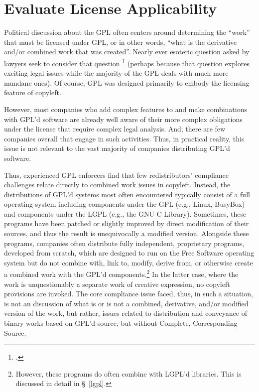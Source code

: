\section{Evaluate License Applicability}
\label{derivative-works}
Political discussion about the GPL often centers around determining the
``work'' that must be licensed under GPL, or in other words, ``what is the
derivative and/or combined work that was created''.  Nearly ever esoteric
question asked by lawyers seek to consider that question
\footnote{.} (perhaps because
that question explores exciting legal issues while the majority of the GPL
deals with much more mundane ones).
Of course, GPL was designed
primarily to embody the licensing feature of copyleft.

However, most companies who add
complex features to and make combinations with GPL'd software
are already well aware of their
more complex obligations under the license that require complex legal
analysis.  And, there are few companies overall that engage in such
activities. Thus,  in practical reality, this issue is not relevant to the vast
majority of companies distributing GPL'd software.

Thus, experienced  GPL enforcers find that few redistributors'
compliance challenges relate directly to combined work issues in copyleft.
Instead, the distributions of GPL'd
systems most often encountered typically consist of a full operating system
including components under the GPL (e.g., Linux, BusyBox) and components
under the LGPL (e.g., the GNU C Library).  Sometimes, these programs have
been patched or slightly improved by direct modification of their sources,
and thus the result is unequivocally a modified version.  Alongside these programs,
companies often distribute fully independent, proprietary programs,
developed from scratch, which are designed to run on the Free Software operating
system but do not combine with, link to, modify, derive from, or otherwise
create a combined work with
the GPL'd components.\footnote{However, these programs do often combine
  with LGPL'd libraries. This is discussed in detail in \S~\ref{lgpl}.}
In the latter case, where the work is unquestionably a separate work of
creative expression, no copyleft provisions are invoked.
The core compliance issue faced, thus, in such a situation, is not an discussion of what is or is not a
combined, derivative, and/or modified version of the work, but rather, issues related to distribution and
conveyance of binary works based on GPL'd source, but without Complete,
Corresponding Source.

